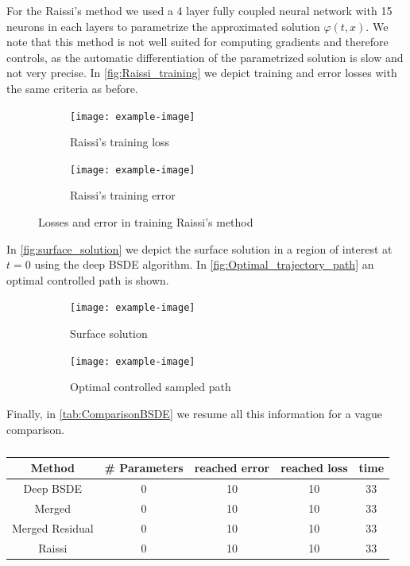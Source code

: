 For the Raissi's method we used a 4 layer fully coupled neural network with 15 neurons in each layers to parametrize the approximated solution $\varphi(t,x)$. We note that this method is not well suited for computing gradients and therefore controls, as the automatic differentiation of the parametrized solution is slow and not very precise. In \autoref{fig:Raissi_training} we depict training and error losses with the same criteria as before.
 \begin{figure}[htb!]		
 	\begin{subfigure}{.475\linewidth}
 		\texttt{[image: example-image]}
 		\caption{Raissi's training loss}
 		\label{fig:Raissi_loss}
 	\end{subfigure}\hfill %
 	\begin{subfigure}{.475\linewidth}
 		\texttt{[image: example-image]}
 		\caption{Raissi's training error}
 		\label{fig:Raissi_error}
 	\end{subfigure}
 	\caption{Losses and error in training Raissi's method }
 	\label{fig:Raissi_training}
 \end{figure}
 
 In \autoref{fig:surface_solution} we depict the surface solution in a region of interest at $t=0$ using the deep BSDE algorithm. In  \autoref{fig:Optimal_trajectory_path} an optimal controlled path is shown.
  \begin{figure}[htb!]		
 	\begin{subfigure}{.475\linewidth}
 		\texttt{[image: example-image]}
 		\caption{Surface solution}
 		\label{fig:surface_solution}
 	\end{subfigure}\hfill %
 	\begin{subfigure}{.475\linewidth}
 		\texttt{[image: example-image]}
 		\caption{Optimal controlled sampled path}
 		\label{fig:Optimal_trajectory_path}
 	\end{subfigure}
 	\caption{}
 	\label{fig:solution_path}
 \end{figure}
Finally, in \autoref{tab:ComparisonBSDE} we resume all this information for a vague comparison.
\begin{table}[H]
	\centering
	\begin{tabular}{|c|c|c|c|c|}
		\hline
		Method & \# Parameters & reached error & reached loss & time \\
		\hline
		Deep BSDE & 0 & 10 & 10 & 33 \\
		\hline
		Merged  & 0 & 10 & 10 & 33 \\
		\hline
		Merged Residual & 0 & 10 & 10 & 33 \\
		\hline
		Raissi & 0 & 10 & 10 & 33 \\
		\hline
	\end{tabular}
\caption{}
\label{tab:ComparisonBSDE}
\end{table}


